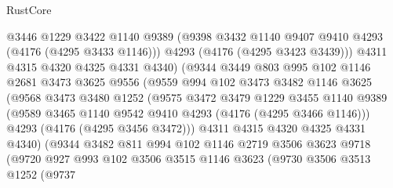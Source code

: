 \begin{lexlean}{RustCore}
\begin{coremodule}
                          @3446
                          @1229
                          @3422
                          @1140
                          @9389
                          (@9398 @3432 @1140 @9407 @9410 @4293 (@4176 (@4295 @3433 @1146)))
                          @4293
                          (@4176 (@4295 @3423 @3439)))
                        @4311
                        @4315
                        @4320
                        @4325
                        @4331
                        @4340)
                      (@9344
                        @3449
                        @803
                        @995
                        @102
                        @1146
                        @2681
                        @3473
                        @3625
                        @9556
                        (@9559
                          @994
                          @102
                          @3473
                          @3482
                          @1146
                          @3625
                          (@9568
                            @3473
                            @3480
                            @1252
                            (@9575
                              @3472
                              @3479
                              @1229
                              @3455
                              @1140
                              @9389
                              (@9589 @3465 @1140 @9542 @9410 @4293 (@4176 (@4295 @3466 @1146)))
                              @4293
                              (@4176 (@4295 @3456 @3472)))
                            @4311
                            @4315
                            @4320
                            @4325
                            @4331
                            @4340)
                          (@9344
                            @3482
                            @811
                            @994
                            @102
                            @1146
                            @2719
                            @3506
                            @3623
                            @9718
                            (@9720
                              @927
                              @993
                              @102
                              @3506
                              @3515
                              @1146
                              @3623
                              (@9730
                                @3506
                                @3513
                                @1252
                                (@9737

\end{coremodule}
\end{lexlean}
